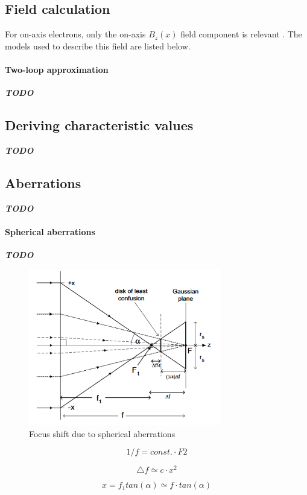 \documentclass[a4paper,12pt]{article}
\newcommand{\todo}{\textbf{\textit{TODO}} }
\begin{document}
  \subsection{Field calculation}
    For on-axis electrons, only the on-axis $B_z(x)$ field component is relevant \cite{Disser}. The models used to describe this field are listed below.

    \paragraph{Two-loop approximation}
      \todo

  \subsection{Deriving characteristic values}
    \todo

  \subsection{Aberrations}
    \todo
    \paragraph{Spherical aberrations} \todo
      \begin{figure}[h]
        \centering
        \includegraphics[width=0.75\textwidth]{cs_illustration}
        \caption{Focus shift due to spherical aberrations}
      \end{figure}

      \[
        1/f=const.\cdotp F2
      \]

      \[
        \triangle f\simeq c\cdotp x^{2}
      \]

      \[
        x=f_{1}tan\left(\alpha\right)\simeq f\cdotp tan\left(\alpha\right)
      \]
\end{document}
